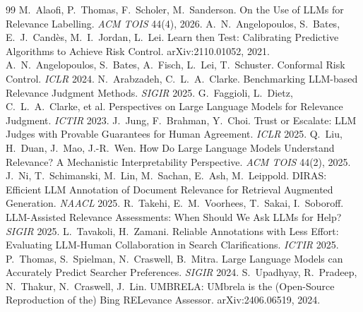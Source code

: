 \documentclass[11pt,a4paper]{article}
\begin{document}
\small
\begin{thebibliography}{99}\setlength{\itemsep}{0pt}
 M.~Alaofi, P.~Thomas, F.~Scholer, M.~Sanderson. On the Use of LLMs for Relevance Labelling. \emph{ACM TOIS} 44(4), 2026.
 A.~N.~Angelopoulos, S.~Bates, E.~J.~Cand\`es, M.~I.~Jordan, L.~Lei. Learn then Test: Calibrating Predictive Algorithms to Achieve Risk Control. arXiv:2110.01052, 2021.
 A.~N.~Angelopoulos, S.~Bates, A.~Fisch, L.~Lei, T.~Schuster. Conformal Risk Control. \emph{ICLR} 2024.
 N.~Arabzadeh, C.~L.~A.~Clarke. Benchmarking LLM-based Relevance Judgment Methods. \emph{SIGIR} 2025.
 G.~Faggioli, L.~Dietz, C.~L.~A.~Clarke, et al. Perspectives on Large Language Models for Relevance Judgment. \emph{ICTIR} 2023.
 J.~Jung, F.~Brahman, Y.~Choi. Trust or Escalate: LLM Judges with Provable Guarantees for Human Agreement. \emph{ICLR} 2025.
 Q.~Liu, H.~Duan, J.~Mao, J.-R.~Wen. How Do Large Language Models Understand Relevance? A Mechanistic Interpretability Perspective. \emph{ACM TOIS} 44(2), 2025.
 J.~Ni, T.~Schimanski, M.~Lin, M.~Sachan, E.~Ash, M.~Leippold. DIRAS: Efficient LLM Annotation of Document Relevance for Retrieval Augmented Generation. \emph{NAACL} 2025.
 R.~Takehi, E.~M.~Voorhees, T.~Sakai, I.~Soboroff. LLM-Assisted Relevance Assessments: When Should We Ask LLMs for Help? \emph{SIGIR} 2025.
 L.~Tavakoli, H.~Zamani. Reliable Annotations with Less Effort: Evaluating LLM-Human Collaboration in Search Clarifications. \emph{ICTIR} 2025.
 P.~Thomas, S.~Spielman, N.~Craswell, B.~Mitra. Large Language Models can Accurately Predict Searcher Preferences. \emph{SIGIR} 2024.
 S.~Upadhyay, R.~Pradeep, N.~Thakur, N.~Craswell, J.~Lin. UMBRELA: UMbrela is the (Open-Source Reproduction of the) Bing RELevance Assessor. arXiv:2406.06519, 2024.
\end{thebibliography}
\end{document}
